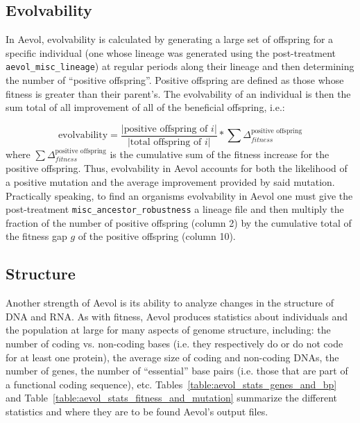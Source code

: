 \subsection{Evolvability}
In Aevol, evolvability is calculated by generating a large set of offspring for a specific individual (one whose lineage was generated using the post-treatment \texttt{aevol\_misc\_lineage}) at regular periods along their lineage and then determining the number of ``positive offspring''. Positive offspring are defined as those whose fitness is greater than their parent's. The evolvability of an individual is then the sum total of all improvement of all of the beneficial offspring, i.e.:

\begin{equation*}
\text{evolvability} = \frac{|\text{positive offspring of }i|}{|\text{total offspring of }i|}*\sum \Delta^{\text{positive offspring}}_{fitness}
\end{equation*}  where $\sum \Delta^{\text{positive offspring}}_{fitness}$ is the cumulative sum of the fitness increase for the positive offspring. Thus, evolvability in Aevol accounts for both the likelihood of a positive mutation and the average improvement provided by said mutation. Practically speaking, to find an organisms evolvability in Aevol one must give the post-treatment \texttt{misc\_ancestor\_robustness} a lineage file and then multiply the fraction of the number of positive offspring (column 2) by the cumulative total of the fitness gap $g$ of the positive offspring (column 10).


 
\subsection{Structure}\label{methods:structure}
Another strength of Aevol is its ability to analyze changes in the structure of DNA and RNA. As with fitness, Aevol produces statistics about individuals and the population at large for many aspects of genome structure, including: the number of coding vs. non-coding bases (i.e. they respectively do or do not code for at least one protein), the average size of coding and non-coding DNAs, the number of genes, the number of ``essential'' base pairs (i.e. those that are part of a functional coding sequence), etc. Tables~\ref{table:aevol_stats_genes_and_bp} and Table~\ref{table:aevol_stats_fitness_and_mutation} summarize the different statistics and where they are to be found Aevol's output files. 

